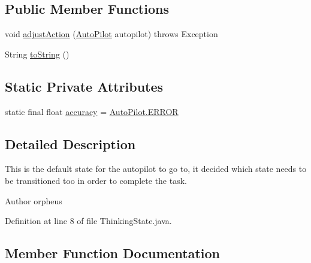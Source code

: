 \subsection*{Public Member Functions}
\begin{DoxyCompactItemize}
\item 
void \hyperlink{class_drone_1_1_drone_controller_1_1_auto_pilot_1_1_thinking_state_a93bd4237b77019c4ac9551ccd5d25418}{adjust\+Action} (\hyperlink{class_drone_1_1_drone_controller_1_1_auto_pilot_1_1_auto_pilot}{Auto\+Pilot} autopilot)  throws Exception  	
\item 
String \hyperlink{class_drone_1_1_drone_controller_1_1_auto_pilot_1_1_thinking_state_a84962965d277b662f5420ce923cde8be}{to\+String} ()
\end{DoxyCompactItemize}
\subsection*{Static Private Attributes}
\begin{DoxyCompactItemize}
\item 
static final float \hyperlink{class_drone_1_1_drone_controller_1_1_auto_pilot_1_1_thinking_state_aed8ca1ed79166b246f8e6b649a32c711}{accuracy} = \hyperlink{class_drone_1_1_drone_controller_1_1_auto_pilot_1_1_auto_pilot_ae04d86839b6b6e571c1919dcc1910b07}{Auto\+Pilot.\+E\+R\+R\+O\+R}
\end{DoxyCompactItemize}


\subsection{Detailed Description}
This is the default state for the autopilot to go to, it decided which state needs to be transitioned too in order to complete the task. \begin{DoxyAuthor}{Author}
orpheus 
\end{DoxyAuthor}


Definition at line 8 of file Thinking\+State.\+java.



\subsection{Member Function Documentation}
\hypertarget{class_drone_1_1_drone_controller_1_1_auto_pilot_1_1_thinking_state_a93bd4237b77019c4ac9551ccd5d25418}{}

